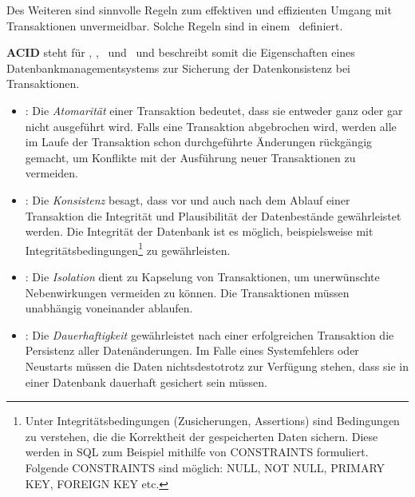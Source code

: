 Des Weiteren sind sinnvolle Regeln zum effektiven und effizienten Umgang mit Transaktionen unvermeidbar. Solche Regeln sind in einem \acid\ definiert.

\textbf{ACID} steht für \Acid, \aCid, \acId\ und \aciD\ und beschreibt somit die Eigenschaften eines Datenbankmanagementsystems zur Sicherung der Datenkonsistenz bei Transaktionen.
\begin{itemize}

\item \Acid: Die \textit{Atomarität} einer Transaktion bedeutet, dass sie entweder ganz oder gar nicht ausgeführt wird. Falls eine Transaktion abgebrochen wird, werden alle im Laufe der Transaktion schon durchgeführte Änderungen rückgängig gemacht, um Konflikte mit der Ausführung neuer Transaktionen zu vermeiden.%
\item \aCid: Die \textit{Konsistenz} besagt, dass vor und auch nach dem Ablauf einer Transaktion die Integrität und Plausibilität der Datenbestände gewährleistet werden. Die Integrität der Datenbank ist es möglich, beispielsweise mit Integritätsbedingungen\footnote{Unter Integritätsbedingungen (Zusicherungen, Assertions) sind Bedingungen zu verstehen, die die Korrektheit der gespeicherten Daten sichern. Diese werden in SQL zum Beispiel mithilfe von CONSTRAINTS formuliert. Folgende CONSTRAINTS sind möglich: NULL, NOT NULL, PRIMARY KEY, FOREIGN KEY etc.} zu gewährleisten. 
\item \acId: Die \textit{Isolation} dient zu Kapselung von Transaktionen, um unerwünschte Nebenwirkungen vermeiden zu können. Die Transaktionen müssen unabhängig voneinander ablaufen.
\item \aciD: Die \textit{Dauerhaftigkeit} gewährleistet nach einer erfolgreichen Transaktion die Persistenz aller Datenänderungen. Im Falle eines Systemfehlers oder Neustarts müssen die Daten nichtsdestotrotz zur Verfügung stehen, dass sie in einer Datenbank dauerhaft gesichert sein müssen.
\end{itemize}

